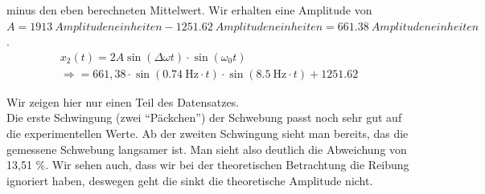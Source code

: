 \documentclass{article}
\begin{document}
                  minus den eben berechneten Mittelwert. Wir erhalten eine Amplitude von \( A = \SI{1913}{Amplitudeneinheiten} - \SI{1251.62}{Amplitudeneinheiten} = \SI{661.38}{Amplitudeneinheiten} \). %
                  \begin{equation}
                      \begin{gathered}
                          x_2(t) = 2 A \sin( \Delta \omega t ) \cdot \sin( \omega_0 t) \\
                          \Rightarrow = 661,38 \cdot \sin( \SI{0.74}{\hertz} \cdot t) \cdot \sin( \SI{8.5}{\hertz} \cdot t) + 1251.62
                      \end{gathered}
                  \end{equation}

                  Wir zeigen hier nur einen Teil des Datensatzes. \\
                  Die erste Schwingung (zwei \enquote{Päckchen}) der Schwebung passt noch sehr gut auf die experimentellen Werte.
                  Ab der zweiten Schwingung sieht man bereits, das die gemessene Schwebung langsamer ist. Man sieht also deutlich die Abweichung von 13,51 \%.
                  Wir sehen auch, dass wir bei der theoretischen Betrachtung die Reibung ignoriert haben, deswegen geht die sinkt die theoretische Amplitude nicht.
\end{document}
